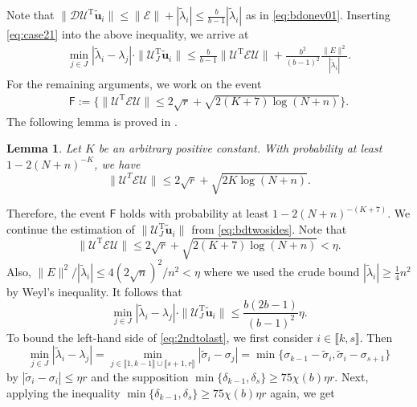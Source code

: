 \documentclass[reqno]{amsart}
\newcommand{\T}{\mathrm{T}}
\theoremstyle{plain}
\newtheorem{lemma}[theorem]{Lemma}
\theoremstyle{definition}
\begin{document}
Note that $\|\mathcal D \mathcal U^\T \widetilde{\mathbf u}_i\| \le \|\mathcal E\| + |\widetilde \lambda_i|\le \frac{b}{b-1} |\widetilde \lambda_i|$ as in \eqref{eq:bdonev01}. Inserting \eqref{eq:case21} into the above inequality, we arrive at
\begin{align}\label{eq:bdtwosides}
\min_{j\in J} |\widetilde \lambda_i - \lambda_j| \cdot \|\mathcal U_J^\T \widetilde{\mathbf u}_i\| \le \frac{b}{b-1} \|  \mathcal U^\T \mathcal E \mathcal U\| + \frac{b^2}{(b-1)^2}\frac{\|E\|^2}{|\widetilde \lambda_i|}.
\end{align}
For the remaining arguments, we work on the event 
\begin{align*}\label{eventF0}
\mathsf F:=\big\{\|  \mathcal U^\T \mathcal E \mathcal U\| \le 2 \sqrt{r}+\sqrt{2(K+7)\log(N+n)}\big\}.%
\end{align*}
The following lemma is proved in \cite[Lemma 18]{OVW2}. 
\begin{lemma}\label{lem:Unoise}
Let $K$ be an arbitrary positive constant. With probability at least $1-2(N+n)^{-K}$, we have 
$$\| \mathcal U^T \mathcal E \mathcal U \| \le 2\sqrt{r} + \sqrt{2K\log(N+n)}.$$
\end{lemma}
Therefore, the event $\mathsf F$ holds with probability at least $1-2(N+n)^{-(K+7)}.$ We continue the estimation of $\|\mathcal U_J^\T \widetilde{\mathbf u}_i\|$ from \eqref{eq:bdtwosides}.  Note  that
$$\|  \mathcal U^\T \mathcal E \mathcal U\| \le 2 \sqrt{r}+\sqrt{2(K+7)\log(N+n)}< \eta.$$  Also, ${\|E\|^2}/{|\widetilde \lambda_i|}\le 4(2\sqrt n)^2/n^2< \eta$ where we used the crude bound $|\widetilde \lambda_i| \ge \frac{1}{4}n^2$ by Weyl's inequality. It follows that
\begin{equation}\label{eq:2ndtolast}
\min_{j\in J} |\widetilde \lambda_i - \lambda_j| \cdot \|\mathcal U_J^\T \widetilde{\mathbf u}_i\| \le  \frac{b(2b-1)}{(b-1)^2}\eta.
\end{equation}
To bound the left-hand side of \eqref{eq:2ndtolast}, we first consider $i \in  \llbracket k, s\rrbracket$. Then $$\min_{j\in J} |\widetilde \lambda_i - \lambda_j| = \min_{j \in \llbracket 1, k-1\rrbracket\cup\llbracket s+1, r\rrbracket} |\widetilde \sigma_i - \sigma_j|=\min\{\sigma_{k-1}-\widetilde \sigma_i, \widetilde \sigma_i -\sigma_{s+1} \}$$ by $|\widetilde \sigma_i -  \sigma_i|\le \eta r$ and the supposition $\min\{\delta_{k-1},\delta_s\}\ge 75\chi(b) \eta r$. Next, applying the inequality $\min\{\delta_{k-1},\delta_s \}\ge 75\chi(b)  \eta r$ again, we get
\end{document}
